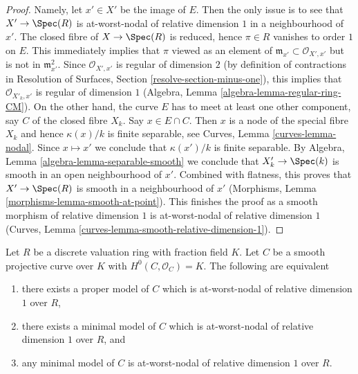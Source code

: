 \begin{proof}
Namely, let $x' \in X'$ be the image of $E$.
Then the only issue is to see that $X' \to \Spec(R)$
is at-worst-nodal of relative dimension $1$
in a neighbourhood of $x'$.
The closed fibre of $X \to \Spec(R)$ is reduced, hence
$\pi \in R$ vanishes to order $1$ on $E$.
This immediately implies that
$\pi$ viewed as an element of
$\mathfrak m_{x'} \subset \mathcal{O}_{X', x'}$ but
is not in $\mathfrak m_{x'}^2$.
Since $\mathcal{O}_{X', x'}$ is regular of
dimension $2$ (by definition of contractions in
Resolution of Surfaces, Section \ref{resolve-section-minus-one}),
this implies that $\mathcal{O}_{X'_k, x'}$
is regular of dimension $1$
(Algebra, Lemma \ref{algebra-lemma-regular-ring-CM}).
On the other hand, the curve $E$ has to meet at
least one other component, say $C$ of the closed fibre $X_k$.
Say $x \in E \cap C$. Then $x$ is a node of the special
fibre $X_k$ and hence $\kappa(x)/k$ is finite separable,
see Curves, Lemma \ref{curves-lemma-nodal}.
Since $x \mapsto x'$ we conclude that $\kappa(x')/k$
is finite separable.
By Algebra, Lemma \ref{algebra-lemma-separable-smooth}
we conclude that $X'_k \to \Spec(k)$ is smooth
in an open neighbourhood of $x'$.
Combined with flatness, this proves that
$X' \to \Spec(R)$ is smooth in a neighbourhood of $x'$
(Morphisms, Lemma \ref{morphisms-lemma-smooth-at-point}).
This finishes the proof as a smooth morphism of
relative dimension $1$ is at-worst-nodal of relative
dimension $1$
(Curves, Lemma \ref{curves-lemma-smooth-relative-dimension-1}).
\end{proof}

\begin{lemma}
\label{lemma-semistable}
Let $R$ be a discrete valuation ring with fraction field $K$.
Let $C$ be a smooth projective curve over $K$ with $H^0(C, \mathcal{O}_C) = K$.
The following are equivalent
\begin{enumerate}
\item there exists a proper model of $C$ which is
at-worst-nodal of relative dimension $1$ over $R$,
\item there exists a minimal model of $C$ which is at-worst-nodal
of relative dimension $1$ over $R$, and
\item any minimal model of $C$ is at-worst-nodal
of relative dimension $1$ over $R$.
\end{enumerate}
\end{lemma}

